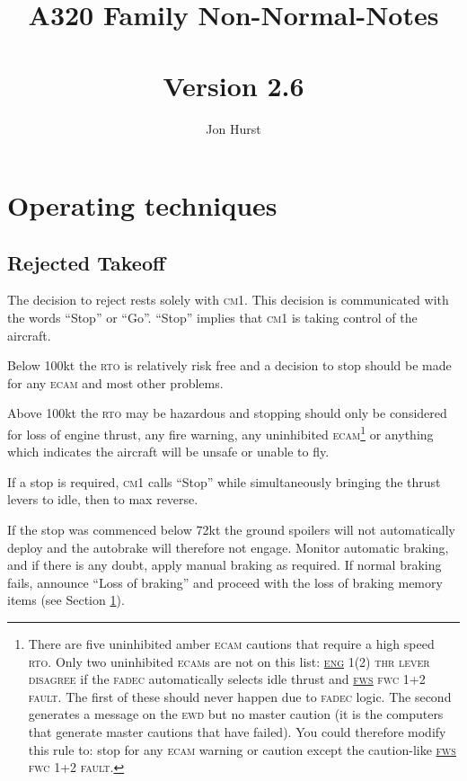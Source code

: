 \documentclass[a5paper,11pt,twoside]{book}
\title{A320 Family Non-Normal-Notes\\~\\\large{Version 2.6}}
\author{Jon Hurst}
\date{}
\newcommand{\ac}[1]{{\scshape\MakeLowercase{#1}}}
\newcommand{\ecam}[2]{{\ac{\uline{#1} #2}}}
\begin{document}
\frontmatter
\maketitle

\ifdefined\HCode
\else
\tableofcontents
\fi

\mainmatter
\chapter{Operating techniques}
\label{sec-loss-of-braking}
\label{sec-all-engine-failure}
\section{Rejected Takeoff}
The decision to reject rests solely with \ac{CM}1. This decision is communicated
with the words ``Stop'' or “Go''. ``Stop'' implies that \ac{CM}1 is taking
control of the aircraft.

Below 100kt the \ac{RTO} is relatively risk free and a decision to stop should
be made for any \ac{ECAM} and most other problems.

Above 100kt the \ac{RTO} may be hazardous and stopping should only be considered
for loss of engine thrust, any fire warning, any uninhibited
\ac{ECAM}\footnote{There are five uninhibited amber \ac{ECAM} cautions that
require a high speed \ac{RTO}. Only two uninhibited \ac{ECAM}s are not on this
list: \ecam{ENG}{1(2) THR LEVER DISAGREE} if the \ac{FADEC} automatically
selects idle thrust and \ecam{FWS}{FWC 1+2 FAULT}. The first of these should
never happen due to \ac{FADEC} logic. The second generates a message on the
\ac{EWD} but no master caution (it is the computers that generate master
cautions that have failed). You could therefore modify this rule to: stop for
any \ac{ECAM} warning or caution except the caution-like \ecam{FWS}{FWC 1+2
  FAULT}.} or anything which indicates the aircraft will be unsafe or unable to
fly.

If a stop is required, \ac{CM}1 calls ``Stop'' while simultaneously bringing the
thrust levers to idle, then to max reverse.

If the stop was commenced below 72kt the ground spoilers will not automatically
deploy and the autobrake will therefore not engage. Monitor automatic braking,
and if there is any doubt, apply manual braking as required. If normal braking
fails, announce ``Loss of braking'' and proceed with the loss of braking memory
items (see Section \ref{sec-loss-of-braking}).
\end{document}
